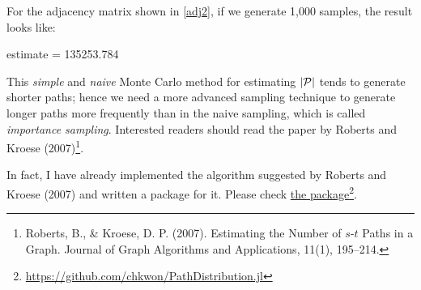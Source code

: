 For the adjacency matrix shown in \eqref{adj2}, if we generate 1,000 samples, the result looks like:
\begin{code}
estimate = 135253.784
\end{code}

This \emph{simple} and \emph{naive} Monte Carlo method for estimating $|\mathcal{P}|$ tends to generate shorter paths; hence we need a more advanced sampling technique to generate longer paths more frequently than in the naive sampling, which is called \emph{importance sampling}. Interested readers should read the paper by Roberts and Kroese (2007)\footnote{Roberts, B., \& Kroese, D. P. (2007). Estimating the Number of $s$-$t$ Paths in a Graph. Journal of Graph Algorithms and Applications, 11(1), 195--214.}.

In fact, I have already implemented the algorithm suggested by Roberts and Kroese (2007) and written a package for it. Please check \href{https://github.com/chkwon/PathDistribution.jl}{the  package}\footnote{\url{https://github.com/chkwon/PathDistribution.jl}}.
